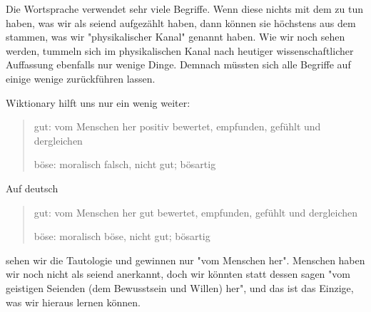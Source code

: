 \documentclass[12pt]{book}
\begin{document}
Die Wortsprache verwendet sehr viele Begriffe. Wenn diese nichts mit dem zu tun haben, was wir als seiend aufgezählt haben, dann können sie höchstens aus dem stammen, was wir "physikalischer Kanal" genannt haben. Wie wir noch sehen werden, tummeln sich im physikalischen Kanal nach heutiger wissenschaftlicher Auffassung ebenfalls nur wenige Dinge. Demnach müssten sich alle Begriffe auf einige wenige zurückführen lassen.

Wiktionary hilft uns nur ein wenig weiter:
\begin{quote}\begin{tcolorbox}
gut: vom Menschen her positiv bewertet, empfunden, gefühlt und dergleichen

böse: moralisch falsch, nicht gut; bösartig
\end{tcolorbox}\end{quote}

Auf deutsch
\begin{quote}\begin{tcolorbox}
gut: vom Menschen her gut bewertet, empfunden, gefühlt und dergleichen

böse: moralisch böse, nicht gut; bösartig
\end{tcolorbox}\end{quote}
sehen wir die Tautologie und gewinnen nur "vom Menschen her". Menschen haben wir noch nicht als seiend anerkannt, doch wir könnten statt dessen sagen "vom geistigen Seienden  (dem Bewusstsein und Willen) her", und das ist das Einzige, was wir hieraus lernen können. 
\end{document}
